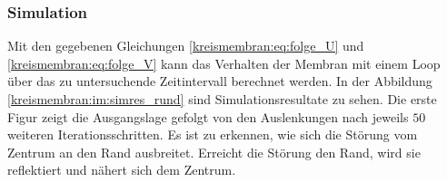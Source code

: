 \subsubsection{Simulation}
Mit den gegebenen Gleichungen \eqref{kreismembran:eq:folge_U} und
\eqref{kreismembran:eq:folge_V} kann das Verhalten der Membran mit einem
Loop über das zu untersuchende Zeitintervall berechnet werden. 
In der Abbildung \ref{kreismembran:im:simres_rund} sind Simulationsresultate zu sehen.
Die erste Figur zeigt die Ausgangslage gefolgt von den Auslenkungen nach jeweils $ 50 $ weiteren Iterationsschritten.
Es ist zu erkennen, wie sich die Störung vom Zentrum an den Rand ausbreitet.
Erreicht die Störung den Rand, wird sie reflektiert und nähert sich dem Zentrum. 
\begin{figure}
	
	\begin{center}
		

\end{center}
\end{figure}
